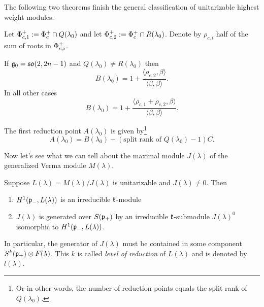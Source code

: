 The following two theorems finish the general classification of unitarizable highest weight modules.

\begin{theorem}
 Let $\Phi^+_{c,1} := \Phi^+_c \cap Q(\lambda_0)$ and let $\Phi^+_{c,2} := \Phi^+_c \cap R(\lambda_0)$. Denote by $\rho_{c,i}$ half of the sum of roots in $\Phi^+_{c,i}$.
 
 If $\mathfrak{g}_0=\mathfrak{so}(2,2n-1)$ and $Q(\lambda_0) \neq R(\lambda_0)$ then \[B(\lambda_0) = 1 + \frac{\langle \rho_{c,2},\beta\rangle}{\langle \beta, \beta \rangle}.\]
 In all other cases \[B(\lambda_0) = 1 + \frac{ \langle \rho_{c,1} + \rho_{c,2} , \beta \rangle}{\langle \beta, \beta \rangle}.\]
\end{theorem}


\begin{theorem}\label{thm:reduction_points}
 The first reduction point $A(\lambda_0)$ is given by\footnote{Or in other words, the number of reduction points equals the split rank of $Q(\lambda_0)$.}
 \[
   A(\lambda_0) = B(\lambda_0) - (\text{split rank of } Q(\lambda_0) -1) C.
 \]
\end{theorem}

Now let's see what we can tell about the maximal module $J(\lambda)$ of the generalized Verma module $M(\lambda)$. %

\begin{theorem}
 Suppose $L(\lambda) = M(\lambda)/J(\lambda)$ is unitarizable and $J(\lambda)\neq 0$. Then
 \begin{enumerate}
  \item $H^1(\mathfrak{p}_-,L(\lambda))$ is an irreducible $\mathfrak{k}$-module
  \item $J(\lambda)$ is generated over $S(\mathfrak{p}_+)$ by an irreducible $\mathfrak{k}$-submodule $J(\lambda)^0$ isomorphic to $H^1(\mathfrak{p}_-,L(\lambda))$.
 \end{enumerate}
\end{theorem}


In particular, the generator of $J(\lambda)$ must be contained in some component $S^k(\mathfrak{p}_+)\otimes F(\lambda)$. This $k$ is called \emph{level of reduction} of $L(\lambda)$ and is denoted by $l(\lambda)$.

